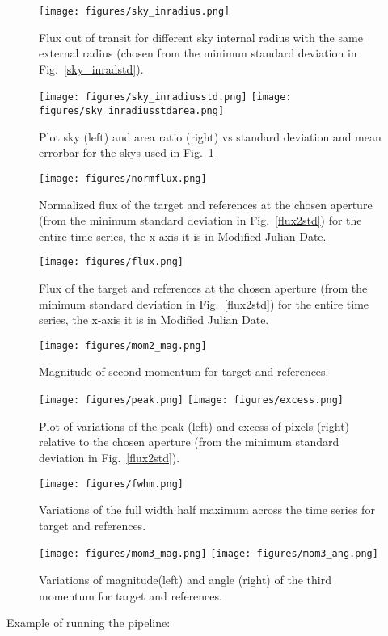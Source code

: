 \documentclass{article}
\newenvironment{cfigure}{
  \begin{figure}
    \begin{center}
}
{
    \end{center}
  \end{figure}
}
\begin{document}
\clearpage

\begin{cfigure}
  \texttt{[image: figures/sky\_inradius.png]}
  \caption{Flux out of transit for different sky internal radius with the same
  external radius (chosen from the minimun standard deviation in Fig.\ \ref{sky_inradstd}).\label{sky_outrad}}
\end{cfigure}
\begin{cfigure}
  \texttt{[image: figures/sky\_inradiusstd.png]}
  \texttt{[image: figures/sky\_inradiusstdarea.png]}
  \caption{Plot sky (left) and area ratio (right) vs standard deviation and mean errorbar for the skys used in Fig.\ \ref{sky_outrad}}
\end{cfigure}

\clearpage

\begin{cfigure}
  \texttt{[image: figures/normflux.png]}
  \caption{Normalized flux of the target and references at the
  chosen aperture (from the minimum standard deviation in Fig.\ \ref{flux2std}) for the entire time series, the x-axis it is in Modified Julian Date.}
\end{cfigure}
\begin{cfigure}
  \texttt{[image: figures/flux.png]}
  \caption{Flux of the target and references at the chosen aperture (from the minimum standard deviation in Fig.\ \ref{flux2std}) for the entire time series, the x-axis it is in Modified Julian Date.}
\end{cfigure}

\clearpage

\begin{cfigure}
  \texttt{[image: figures/mom2\_mag.png]}
  \caption{Magnitude of second momentum for target and references.}
\end{cfigure}
\begin{cfigure}
  \texttt{[image: figures/peak.png]}
  \texttt{[image: figures/excess.png]}
  \caption{Plot of variations of the peak (left) and excess of pixels (right) relative to
  the chosen aperture (from the minimum standard deviation in Fig.\ \ref{flux2std}).}
\end{cfigure}

\clearpage

\begin{cfigure}
  \texttt{[image: figures/fwhm.png]}
  \caption{Variations of the full width half maximum across the time series for
  target and references.}
\end{cfigure}
\begin{cfigure}
  \texttt{[image: figures/mom3\_mag.png]}
  \texttt{[image: figures/mom3\_ang.png]}
  \caption{Variations of magnitude(left) and angle (right) of the third momentum for
  target and references.}
\end{cfigure}

\clearpage

\vspace{20cm}
Example of running the pipeline:
\\
\pipeline
\end{document}
